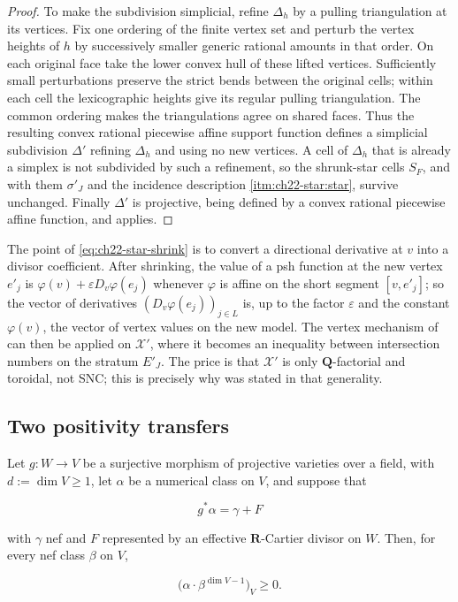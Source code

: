\begin{proof}
To make the subdivision simplicial, refine $\Delta_h$ by a pulling
triangulation at its vertices.  Fix one ordering of the finite vertex set
and perturb the vertex heights of $h$ by successively smaller generic
rational amounts in that order.  On each original face take the lower
convex hull of these lifted vertices.  Sufficiently small perturbations
preserve the strict bends between the original cells; within each cell the
lexicographic heights give its regular pulling triangulation.  The common
ordering makes the triangulations agree on shared faces.  Thus the resulting
convex rational piecewise affine support function defines a simplicial
subdivision $\Delta'$ refining $\Delta_h$ and using no new vertices.  A cell of $\Delta_h$ that is already a simplex is
not
subdivided by such a refinement, so the shrunk-star cells $S_F$, and with
them $\sigma'_J$ and the incidence description
\cref{itm:ch22-star:star}, survive unchanged.  Finally
$\Delta'$ is projective, being defined by a convex rational piecewise
affine function, and  applies.
\end{proof}

\begin{remark}
\label{rem:ch22-why-shrink}
The point of \eqref{eq:ch22-star-shrink} is to convert a directional
derivative at $v$ into a divisor coefficient.  After shrinking, the value
of a psh function at the new vertex $e'_j$ is
$\varphi(v)+\varepsilon D_v\varphi(e_j)$ whenever $\varphi$ is affine on
the short segment $[v,e'_j]$; so the vector of derivatives
$(D_v\varphi(e_j))_{j\in L}$ is, up to the factor $\varepsilon$ and the
constant $\varphi(v)$, the vector of vertex values on the new model.  The
vertex mechanism of  can then be applied on
$\mathcal X'$, where it becomes an inequality between intersection numbers
on the stratum $E'_J$.  The price is that $\mathcal X'$ is only
$\mathbf Q$-factorial and toroidal, not SNC; this is precisely why
 was stated in that generality.
\end{remark}

\subsection{Two positivity transfers}

\begin{lemma}
\label{lem:ch22-pullback-positivity}
Let $g:W\to V$ be a surjective morphism of projective varieties over a
field, with $d:=\dim V\geq1$, let $\alpha$ be a numerical class on $V$,
and suppose that

\[
                 g^*\alpha=\gamma+F
\]

with $\gamma$ nef and $F$ represented by an effective
$\mathbf R$-Cartier divisor on $W$.  Then, for every nef class $\beta$ on $V$,

\[
                      \bigl(\alpha\cdot\beta^{\dim V-1}\bigr)_V\geq0 .
\tag{22.39}\label{eq:ch22-pullback-pseudoeffective}
\]
\end{lemma}

